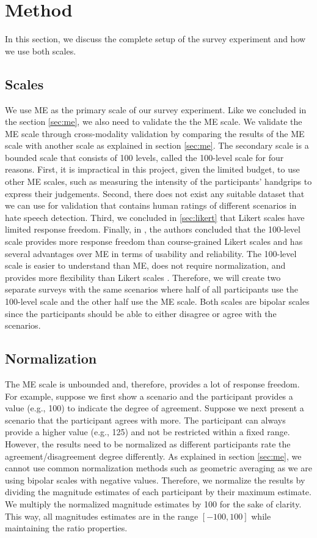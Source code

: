\section{Method}
\label{sec:survey-method}
In this section, we discuss the complete setup of the survey experiment and how we use both scales.

\subsection{Scales}
We use ME as the primary scale of our survey experiment.
%
Like we concluded in the section \ref{sec:me}, we also need to validate the the ME scale.
%
We validate the ME scale through cross-modality validation by comparing the results of the ME scale with another scale as explained in section \ref{sec:me}.
%
The secondary scale is a bounded scale that consists of 100 levels, called the 100-level scale  for four reasons.
%
First, it is impractical in this project, given the limited budget, to use other ME scales, such as measuring the intensity of the participants' handgrips to express their judgements.
%
Second, there does not exist any suitable dataset that we can use for validation that contains human ratings of different scenarios in hate speech detection.
%
Third, we concluded in \ref{sec:likert} that Likert scales have limited response freedom.
%
Finally, in \citet{roitero2018fine}, the authors concluded that the 100-level scale provides more response freedom than course-grained Likert scales and has several advantages over ME in terms of usability and reliability.
%
The 100-level scale is easier to understand than ME, does not require normalization, and provides more flexibility than Likert scales \citep{roitero2018fine}.
%
Therefore, we will create two separate surveys with the same scenarios where half of all participants use the 100-level scale and the other half use the ME scale.
%
Both scales are bipolar scales since the participants should be able to either disagree or agree with the scenarios.

\subsection{Normalization}
The ME scale is unbounded and, therefore, provides a lot of response freedom.
%
For example, suppose we first show a scenario and the participant provides a value (e.g., 100) to indicate the degree of agreement.
%
Suppose we next present a scenario that the participant agrees with more.
%
The participant can always provide a higher value (e.g., 125) and not be restricted within a fixed range.
%
However, the results need to be normalized as different participants rate the agreement/disagreement degree differently.
%
As explained in section \ref{sec:me}, we cannot use common normalization methods such as geometric averaging as we are using bipolar scales with negative values.
%
Therefore, we normalize the results by dividing the magnitude estimates of each participant by their maximum estimate.
%
We multiply the normalized magnitude estimates by 100 for the sake of clarity.
%
This way, all magnitudes estimates are in the range $[-100, 100]$ while maintaining the ratio properties.

